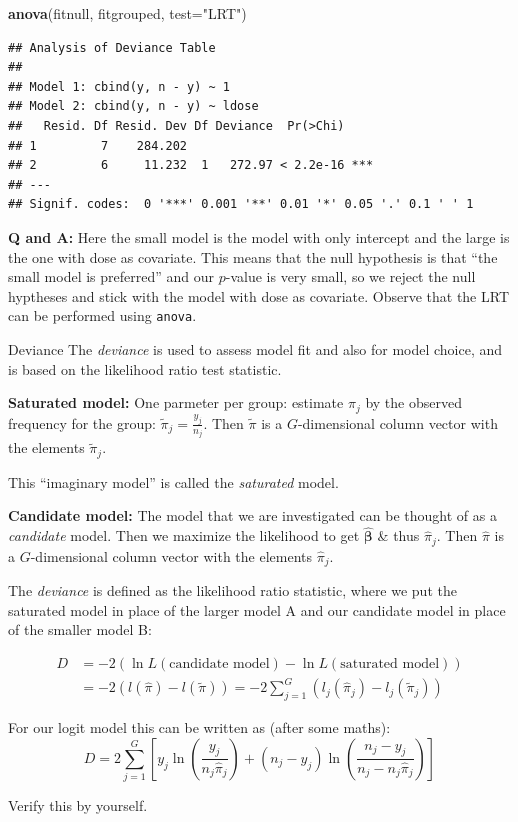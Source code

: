 \documentclass[
  ignorenonframetext,
]{beamer}
\newenvironment{Shaded}{\begin{snugshade}}{\end{snugshade}}
\newcommand{\AttributeTok}[1]{\textcolor[rgb]{0.13,0.29,0.53}{#1}}
\newcommand{\FunctionTok}[1]{\textcolor[rgb]{0.13,0.29,0.53}{\textbf{#1}}}
\newcommand{\NormalTok}[1]{#1}
\newcommand{\StringTok}[1]{\textcolor[rgb]{0.31,0.60,0.02}{#1}}
\begin{document}
\begin{frame}[fragile]
\begin{Shaded}
\begin{Highlighting}[]
\FunctionTok{anova}\NormalTok{(fitnull, fitgrouped, }\AttributeTok{test=}\StringTok{"LRT"}\NormalTok{)}
\end{Highlighting}
\end{Shaded}

\begin{verbatim}
## Analysis of Deviance Table
## 
## Model 1: cbind(y, n - y) ~ 1
## Model 2: cbind(y, n - y) ~ ldose
##   Resid. Df Resid. Dev Df Deviance  Pr(>Chi)    
## 1         7    284.202                          
## 2         6     11.232  1   272.97 < 2.2e-16 ***
## ---
## Signif. codes:  0 '***' 0.001 '**' 0.01 '*' 0.05 '.' 0.1 ' ' 1
\end{verbatim}

\textbf{Q and A:} Here the small model is the model with only intercept
and the large is the one with dose as covariate. This means that the
null hypothesis is that ``the small model is preferred'' and our
\(p\)-value is very small, so we reject the null hyptheses and stick
with the model with dose as covariate. Observe that the LRT can be
performed using \texttt{anova}.
\end{frame}

\begin{frame}{Deviance}
\protect\hypertarget{deviance}{}
The \emph{deviance} is used to assess model fit and also for model
choice, and is based on the likelihood ratio test statistic.

\textbf{Saturated model:} One parmeter per group: estimate \(\pi_j\) by
the observed frequency for the group: \(\tilde{\pi}_j=\frac{y_j}{n_j}\).
Then \(\tilde{\pi}\) is a \(G\)-dimensional column vector with the
elements \(\tilde{\pi}_j\).

This ``imaginary model'' is called the \emph{saturated} model.

\textbf{Candidate model:} The model that we are investigated can be
thought of as a \emph{candidate} model. Then we maximize the likelihood
to get \(\hat{\boldsymbol{\beta}}\) \& thus \(\hat{\pi}_j\). Then
\(\hat{\pi}\) is a \(G\)-dimensional column vector with the elements
\(\hat{\pi}_j\).
\end{frame}

\begin{frame}
The \emph{deviance} is defined as the likelihood ratio statistic, where
we put the saturated model in place of the larger model A and our
candidate model in place of the smaller model B:

\[
\begin{aligned}
D&=-2(\ln L(\text{candidate model})-\ln L(\text{saturated model})) \\
&=-2(l(\hat{\pi})-l(\tilde{\pi}))=
-2\sum_{j=1}^G(l_j(\hat{\pi}_j)-l_j(\tilde{\pi}_j))
\end{aligned}
\]

For our logit model this can be written as (after some maths): \[ 
D=2\sum_{j=1}^G [y_j\ln(\frac{y_j}{n_j\hat{\pi}_j})+(n_j-y_j)\ln(\frac{n_j-y_j}{n_j-n_j\hat{\pi}_j})]
\]

Verify this by yourself.
\end{frame}
\end{document}
